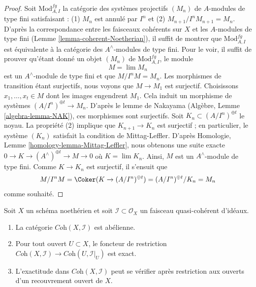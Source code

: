 \begin{proof}
Soit $\text{Mod}^{fg}_{A, I}$ la catégorie des systèmes projectifs $(M_n)$
de $A$-modules de type fini satisfaisant : (1) $M_n$ est annulé par $I^n$ et (2)
$M_{n + 1}/I^nM_{n + 1} = M_n$. D'après la correspondance entre les faisceaux
cohérents sur $X$ et les $A$-modules de type fini (Lemme \ref{lemma-coherent-Noetherian}),
il suffit de montrer que $\text{Mod}^{fg}_{A, I}$ est équivalente à la catégorie des
$A^\wedge$-modules de type fini. Pour le voir, il suffit de prouver qu'étant donné
un objet $(M_n)$ de $\text{Mod}^{fg}_{A, I}$, le module
$$
M = \lim M_n
$$
est un $A^\wedge$-module de type fini et que $M/I^nM = M_n$. Les morphismes de
transition étant surjectifs, nous voyons que $M \to M_1$ est surjectif.
Choisissons $x_1, \ldots, x_t \in M$ dont les images engendrent $M_1$.
Cela induit un morphisme de systèmes $(A/I^n)^{\oplus t} \to M_n$.
D'après le lemme de Nakayama (Algèbre, Lemme \ref{algebra-lemma-NAK}), ces morphismes sont
surjectifs. Soit $K_n \subset (A/I^n)^{\oplus t}$ le noyau.
La propriété (2) implique que $K_{n + 1} \to K_n$ est surjectif ; en particulier,
le système $(K_n)$ satisfait la condition de Mittag-Leffler.
D'après Homologie, Lemme \ref{homology-lemma-Mittag-Leffler},
nous obtenons une suite exacte
$0 \to K \to (A^\wedge)^{\oplus t} \to M \to 0$
où $K = \lim K_n$.
Ainsi, $M$ est un $A^\wedge$-module de type fini.
Comme $K \to K_n$ est surjectif, il s'ensuit que
$$
M/I^nM = \Coker(K \to (A/I^n)^{\oplus t}) =
(A/I^n)^{\oplus t}/K_n = M_n
$$
comme souhaité.
\end{proof}

\begin{lemma}
\label{lemma-inverse-systems-abelian}
Soit $X$ un schéma noethérien et soit $\mathcal{I} \subset \mathcal{O}_X$
un faisceau quasi-cohérent d'idéaux.
\begin{enumerate}
\item La catégorie $\textit{Coh}(X, \mathcal{I})$ est abélienne.
\item Pour tout ouvert $U \subset X$, le foncteur de restriction
$\textit{Coh}(X, \mathcal{I}) \to \textit{Coh}(U, \mathcal{I}|_U)$
est exact.
\item L'exactitude dans $\textit{Coh}(X, \mathcal{I})$ peut se vérifier après
restriction aux ouverts d'un recouvrement ouvert de $X$.
\end{enumerate}
\end{lemma}

